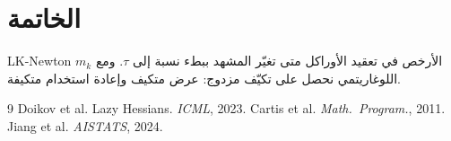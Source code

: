 ﻿\documentclass[12pt,a4paper]{article}
\begin{document}
\section{الخاتمة}
\textenglish{LK-Newton} الأرخص في تعقيد الأوراكل متى تغيّر المشهد ببطء نسبة
إلى $\tau$. ومع $m_k$ اللوغاريتمي نحصل على تكيّف مزدوج: عرض متكيف وإعادة
استخدام متكيفة.

\begin{english}
\begin{thebibliography}{9}
 Doikov et al. Lazy Hessians. \textit{ICML}, 2023.
 Cartis et al. \textit{Math.\ Program.}, 2011.
 Jiang et al. \textit{AISTATS}, 2024.
\end{thebibliography}
\end{english}
\end{document}

